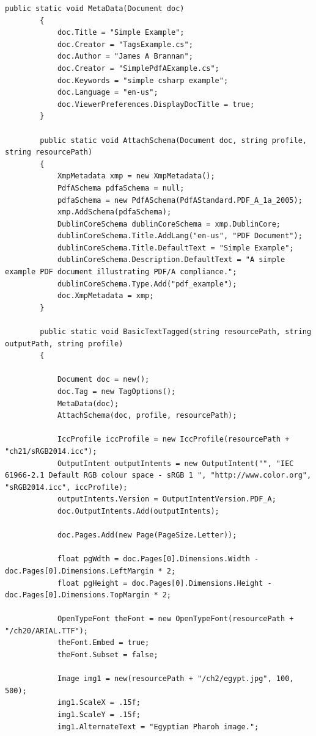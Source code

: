 \documentclass[american]{tufte-book}
\numberwithin{equation}{section}
\numberwithin{figure}{section}
\begin{document}
{{\begin{lstlisting}[caption={Creating a PDF/A-1a PDF document.},label={lis:Creating-a-PDF/A-1a-1},basicstyle={\footnotesize\ttfamily},breaklines=true]
        public static void MetaData(Document doc)
        {
            doc.Title = "Simple Example";
            doc.Creator = "TagsExample.cs";
            doc.Author = "James A Brannan";
            doc.Creator = "SimplePdfAExample.cs";
            doc.Keywords = "simple csharp example";
            doc.Language = "en-us";
            doc.ViewerPreferences.DisplayDocTitle = true;
        }

        public static void AttachSchema(Document doc, string profile, string resourcePath)
        {
            XmpMetadata xmp = new XmpMetadata();
            PdfASchema pdfaSchema = null;
            pdfaSchema = new PdfASchema(PdfAStandard.PDF_A_1a_2005);
            xmp.AddSchema(pdfaSchema);
            DublinCoreSchema dublinCoreSchema = xmp.DublinCore;
            dublinCoreSchema.Title.AddLang("en-us", "PDF Document");
            dublinCoreSchema.Title.DefaultText = "Simple Example";
            dublinCoreSchema.Description.DefaultText = "A simple example PDF document illustrating PDF/A compliance.";
            dublinCoreSchema.Type.Add("pdf_example");
            doc.XmpMetadata = xmp;
        }

        public static void BasicTextTagged(string resourcePath, string outputPath, string profile)
        {

            Document doc = new();
            doc.Tag = new TagOptions();
            MetaData(doc);
            AttachSchema(doc, profile, resourcePath);
                        
            IccProfile iccProfile = new IccProfile(resourcePath + "ch21/sRGB2014.icc");
            OutputIntent outputIntents = new OutputIntent("", "IEC 61966-2.1 Default RGB colour space - sRGB 1 ", "http://www.color.org", "sRGB2014.icc", iccProfile);
            outputIntents.Version = OutputIntentVersion.PDF_A;
            doc.OutputIntents.Add(outputIntents);

            doc.Pages.Add(new Page(PageSize.Letter));

            float pgWdth = doc.Pages[0].Dimensions.Width - doc.Pages[0].Dimensions.LeftMargin * 2;
            float pgHeight = doc.Pages[0].Dimensions.Height - doc.Pages[0].Dimensions.TopMargin * 2;

            OpenTypeFont theFont = new OpenTypeFont(resourcePath + "/ch20/ARIAL.TTF");
            theFont.Embed = true;
            theFont.Subset = false;

            Image img1 = new(resourcePath + "/ch2/egypt.jpg", 100, 500);
            img1.ScaleX = .15f;
            img1.ScaleY = .15f;
            img1.AlternateText = "Egyptian Pharoh image.";


\end{lstlisting}}}
\end{document}
